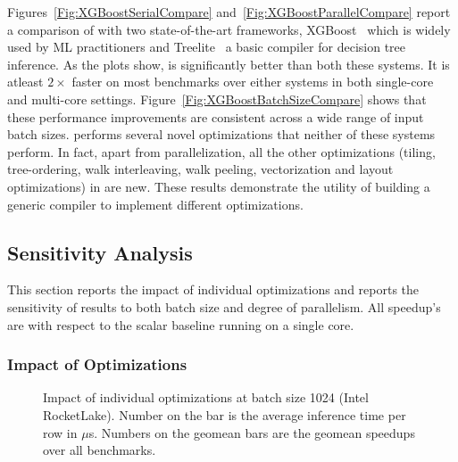 Figures~\ref{Fig:XGBoostSerialCompare} and~\ref{Fig:XGBoostParallelCompare} report a comparison of \Treebeard{} with
two state-of-the-art frameworks, XGBoost~\cite{XGBoost} which is widely used by ML practitioners and Treelite~\cite{Treelite} a
basic compiler for decision tree inference. As the plots show, \Treebeard{} is significantly better than both these systems.
It is atleast $2\times$ faster on most benchmarks over either systems in both single-core and multi-core settings.
Figure~\ref{Fig:XGBoostBatchSizeCompare} shows that these performance improvements are consistent across a wide range of input batch sizes. 
\Treebeard{} performs several novel optimizations that neither of these systems perform. In fact, apart from parallelization,
all the other optimizations (tiling, tree-ordering, walk interleaving, walk peeling, vectorization and layout optimizations)
in \Treebeard{} are new. These results demonstrate the utility of building a generic compiler to implement different optimizations.


\subsection{Sensitivity Analysis}
This section reports the impact of individual optimizations and reports the sensitivity of results to both batch size and degree of parallelism. All speedup's are with respect to the scalar baseline running on a single core.
\subsubsection{Impact of Optimizations}

\begin{figure}
  \centering
  \caption{Impact of individual \Treebeard{} optimizations at batch size 1024 (Intel RocketLake).
           Number on the bar is the average inference time per row in $\mu$s. Numbers on the geomean bars are the geomean
           speedups over all benchmarks.}
  \label{fig:OptSpeedup}
\end{figure}


